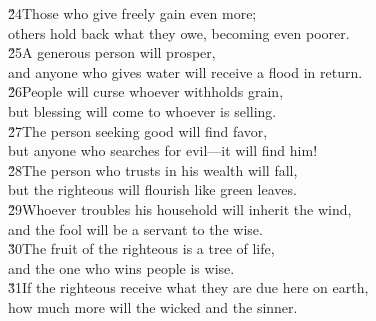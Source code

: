 \begin{poetry}
\poeml \v{24}Those who give freely gain even more; \\
\poemll    others hold back what they owe, becoming even poorer. \\
\poeml \v{25}A generous person will prosper, \\
\poemll    and anyone who gives water will receive a flood in return. \\
\poeml \v{26}People will curse whoever withholds grain, \\
\poemll    but blessing will come to whoever is selling. \\
\poeml \v{27}The person seeking good will find favor, \\
\poemll    but anyone who searches for evil---it will find him! \\
\poeml \v{28}The person who trusts in his wealth will fall, \\
\poemll    but the righteous will flourish like green leaves. \\
\poeml \v{29}Whoever troubles his household will inherit the wind, \\
\poemll    and the fool will be a servant to the wise. \\
\poeml \v{30}The fruit of the righteous is a tree of life, \\
\poemll    and the one who wins people is wise. \\
\poeml \v{31}If the righteous receive what they are due here on earth, \\
\poemll    how much more will the wicked and the sinner.
\end{poetry}

